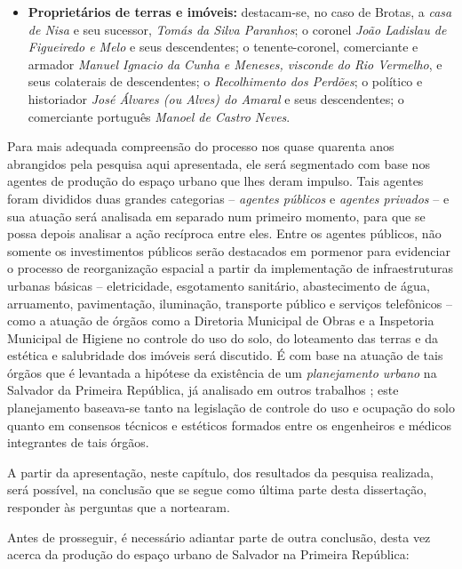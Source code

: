 \begin{itemize}
\item \textbf{Proprietários de terras e imóveis:} destacam-se, no caso de Brotas, a \textit{casa de Nisa} e seu sucessor, \textit{Tomás da Silva Paranhos}; o coronel \textit{João Ladislau de Figueiredo e Melo} e seus descendentes; o tenente-coronel, comerciante e armador \textit{Manuel Ignacio da Cunha e Meneses, visconde do Rio Vermelho}, e seus colaterais de descendentes; o \textit{Recolhimento dos Perdões}; o político e historiador \textit{José Álvares (ou Alves) do Amaral} e seus descendentes; o comerciante português \textit{Manoel de Castro Neves}.
\end{itemize}

Para mais adequada compreensão do processo nos quase quarenta anos abrangidos pela pesquisa aqui apresentada, ele será segmentado com base nos agentes de produção do espaço urbano que lhes deram impulso. Tais agentes foram divididos duas grandes categorias -- \textit{agentes públicos} e \textit{agentes privados} -- e sua atuação será analisada em separado num primeiro momento, para que se possa depois analisar a ação recíproca entre eles. Entre os agentes públicos, não somente os investimentos públicos serão destacados em pormenor para evidenciar o processo de reorganização espacial a partir da implementação de infraestruturas urbanas básicas -- eletricidade, esgotamento sanitário, abastecimento de água, arruamento, pavimentação, iluminação, transporte público e serviços telefônicos -- como a atuação de órgãos como a Diretoria Municipal de Obras e a Inspetoria Municipal de Higiene no controle do uso do solo, do loteamento das terras e da estética e salubridade dos imóveis será discutido. É com base na atuação de tais órgãos que é levantada a hipótese da existência de um \textit{planejamento urbano} na Salvador da Primeira República, já analisado em outros trabalhos \cite{almeida_victoria_1997,almeida_vitrinescomercio_2014}; este planejamento baseava-se tanto na legislação de controle do uso e ocupação do solo quanto em consensos técnicos e estéticos formados entre os engenheiros e médicos integrantes de tais órgãos.

A partir da apresentação, neste capítulo, dos resultados da pesquisa realizada, será possível, na conclusão que se segue como última parte desta dissertação, responder às perguntas que a nortearam.

Antes de prosseguir, é necessário adiantar parte de outra conclusão, desta vez acerca da produção do espaço urbano de Salvador na Primeira República:


